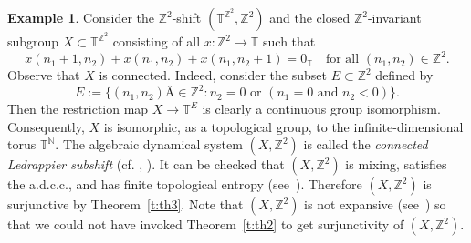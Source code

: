 \documentclass[12pt,a4paper]{amsart}
\theoremstyle{definition}
\newtheorem{example}[theorem]{Example}
\numberwithin{equation}{section}
\begin{document}
\begin{example}
\label{ex:ledrappier}
Consider the ${\mathbb{Z}}^2$-shift $({\mathbb{T}}^{{\mathbb{Z}}^2},{\mathbb{Z}}^2)$ and the closed ${\mathbb{Z}}^2$-invariant subgroup 
$X \subset {\mathbb{T}}^{{\mathbb{Z}}^2}$ consisting of all $x \colon  {\mathbb{Z}}^2 \to {\mathbb{T}}$ such that
$$
x(n_1 + 1,n_2) + x(n_1,n_2) + x(n_1,n_2 + 1) = 0_{\mathbb{T}} \quad \text{for all  } (n_1,n_2)   \in {\mathbb{Z}}^2.
$$
Observe that $X$ is connected. Indeed, consider the subset $E \subset {\mathbb{Z}}^2$ defined by
$$
E := \{(n_1,n_2)Â \in {\mathbb{Z}}^2 : n_2 = 0 \text{ or } (n_1 = 0 \text{ and } n_2 < 0)\}.
$$
Then the  restriction map $X \to {\mathbb{T}}^E$ is clearly a continuous group isomorphism.
Consequently, $X$  is isomorphic, as a topological group, to the infinite-dimensional torus ${\mathbb{T}}^{\mathbb{N}}$. 
The algebraic dynamical system $(X,{\mathbb{Z}}^2)$ is called the \emph{connected Ledrappier subshift}
(cf. \cite[Example~5.6]{lind-schmidt-handbook}, \cite{schmidt-book}).
It can be checked  that $(X,{\mathbb{Z}}^2)$ is mixing, satisfies the a.d.c.c., and has finite topological entropy
(see~\cite{schmidt-book}).
Therefore $(X,{\mathbb{Z}}^2)$ is surjunctive by Theorem~\ref{t:th3}.
Note that $(X,{\mathbb{Z}}^2)$ is not expansive (see~\cite{schmidt-book}) so that we could not have invoked Theorem~\ref{t:th2}
to get surjunctivity of $(X,{\mathbb{Z}}^2)$. 
\end{example}
\end{document}
